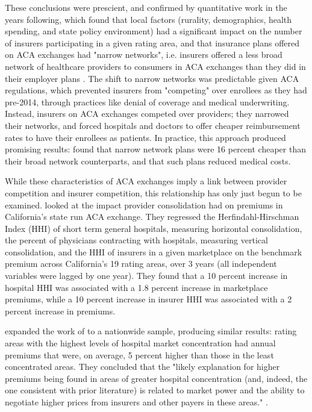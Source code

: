 \documentclass[12pt,letterpaper]{article}
\begin{document}
These conclusions were prescient, and confirmed by quantitative work in the years following, which found that local factors (rurality, demographics, health spending, and state policy environment) had a significant impact on the number of insurers participating in a given rating area, and that insurance plans offered on ACA exchanges had "narrow networks", i.e. insurers offered a less broad network of healthcare providers to consumers in ACA exchanges than they did in their employer plans \citep{griffith_diminishing_2018} \citep{haeder_narrow_2015} . The shift to narrow networks was predictable given ACA regulations, which prevented insurers from "competing" over enrollees as they had pre-2014, through practices like denial of coverage and medical underwriting. Instead, insurers on ACA exchanges competed over providers; they narrowed their networks, and forced hospitals and doctors to offer cheaper reimbursement rates to have their enrollees as patients. In practice, this approach produced promising results: \citet{dafny_narrow_2017} found that narrow network plans were 16 percent cheaper than their broad network counterparts, and that such plans reduced medical costs. 

While these characteristics of ACA exchanges imply a link between provider competition and insurer competition, this relationship has only just begun to be examined. \citet{scheffler_consolidation_2018} looked at the impact provider consolidation had on premiums in California's state run ACA exchange. They regressed the Herfindahl-Hirschman Index (HHI) of short term general hospitals, measuring horizontal consolidation, the percent of physicians contracting with hospitals, measuring vertical consolidation, and the HHI of insurers in a given marketplace on the benchmark premium across California's 19 rating areas, over 3 years (all independent variables were lagged by one year). They found that a 10 percent increase in hospital HHI was associated with a 1.8 percent increase in marketplace premiums, while a 10 percent increase in insurer HHI was associated with a 2 percent increase in premiums.

\citet{boozary_association_2019} expanded the work of \citet{scheffler_consolidation_2018} to a nationwide sample, producing similar results: rating areas with the highest levels of hospital market concentration had annual premiums that were, on average, 5 percent higher than those in the least concentrated areas. They concluded that the "likely explanation for higher premiums being found in areas of greater hospital concentration (and, indeed, the one consistent with prior literature) is related to market power and the ability to negotiate higher prices from insurers and other payers in these areas." \citep{boozary_association_2019}. 
\end{document}
